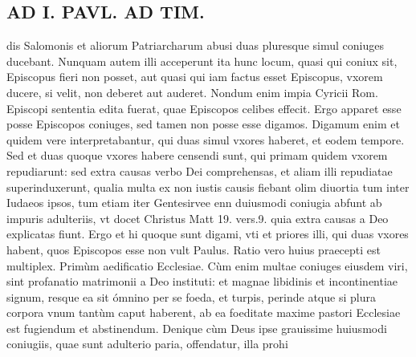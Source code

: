 \documentclass{article}
\begin{document}
\begin{pages}
\section*{AD I. PAVL. AD TIM. }
\marginpar{[ p.106 ]}\pstart dis Salomonis et aliorum Patriarcharum abusi duas pluresque simul coniuges ducebant. Nunquam autem illi acceperunt ita hunc locum, quasi qui coniux sit, Episcopus fieri non posset, aut quasi qui iam factus esset Episcopus, vxorem ducere, si velit, non deberet aut auderet. Nondum enim impia Cyricii Rom. Episcopi sententia edita fuerat, quae Episcopos celibes effecit. Ergo apparet esse posse Episcopos coniuges, sed tamen non posse esse digamos. Digamum enim et quidem vere interpretabantur, qui duas simul vxores haberet, et eodem tempore. Sed et duas quoque vxores habere censendi sunt, qui primam quidem vxorem repudiarunt: sed extra causas verbo Dei comprehensas, et aliam illi repudiatae superinduxerunt, qualia multa ex non iustis causis fiebant olim diuortia tum inter Iudaeos ipsos, tum etiam iter Gentesirvee enn duiusmodi coniugia abfunt ab impuris adulteriis, vt docet Christus Matt 19. vers.9. quia extra causas a Deo explicatas fiunt. Ergo et hi quoque sunt digami, vti et priores illi, qui duas vxores habent, quos Episcopos esse non vult Paulus.  \pend\pstart Ratio vero huius praecepti est multiplex. Primùm aedificatio Ecclesiae. Cùm enim multae coniuges eiusdem viri, sint profanatio matrimonii a Deo instituti: et magnae libidinis et incontinentiae signum, resque ea sit ómnino per se foeda, et turpis, perinde atque si plura corpora vnum tantùm caput haberent, ab ea foeditate maxime pastori Ecclesiae est fugiendum et abstinendum. Denique  cùm Deus ipse grauissime huiusmodi coniugiis, quae sunt adulterio paria, offendatur, illa prohi\pend

\end{pages}
\end{document}
